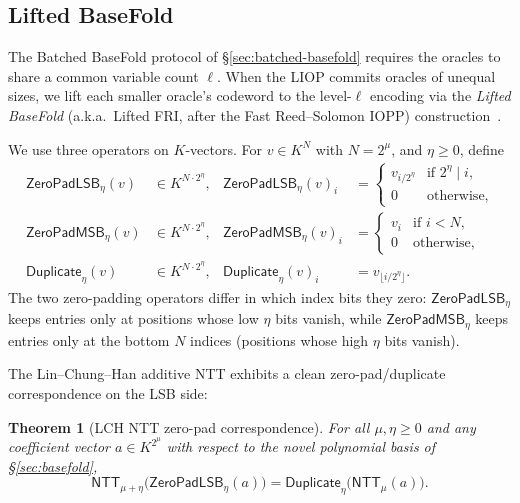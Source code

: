 \documentclass{article}
\newtheorem{theorem}{Theorem}[section]
\theoremstyle{definition}
\begin{document}
\subsection{Lifted BaseFold}
\label{sec:lifted-basefold}

The Batched BaseFold protocol of \S\ref{sec:batched-basefold} requires the oracles to share a common variable count $\boldsymbol{\ell}$. When the LIOP commits oracles of unequal sizes, we lift each smaller oracle's codeword to the level-$\boldsymbol{\ell}$ encoding via the \emph{Lifted BaseFold} (a.k.a.~Lifted FRI, after the Fast Reed--Solomon IOPP) construction~\cite{youtube:LiftedFRI}.

We use three operators on $K$-vectors. For $v \in K^N$ with $N = 2^\mu$, and $\eta \geq 0$, define
\begin{align*}
  \textsf{ZeroPadLSB}_\eta(v) &\in K^{N \cdot 2^\eta}, & \textsf{ZeroPadLSB}_\eta(v)_i &= \begin{cases} v_{i / 2^\eta} & \text{if } 2^\eta \mid i, \\ 0 & \text{otherwise,} \end{cases} \\
  \textsf{ZeroPadMSB}_\eta(v) &\in K^{N \cdot 2^\eta}, & \textsf{ZeroPadMSB}_\eta(v)_i &= \begin{cases} v_i & \text{if } i < N, \\ 0 & \text{otherwise,} \end{cases} \\
  \textsf{Duplicate}_\eta(v) &\in K^{N \cdot 2^\eta}, & \textsf{Duplicate}_\eta(v)_i &= v_{\lfloor i / 2^\eta \rfloor}.
\end{align*}
The two zero-padding operators differ in which index bits they zero: $\textsf{ZeroPadLSB}_\eta$ keeps entries only at positions whose low $\eta$ bits vanish, while $\textsf{ZeroPadMSB}_\eta$ keeps entries only at the bottom $N$ indices (positions whose high $\eta$ bits vanish).

The Lin--Chung--Han additive NTT exhibits a clean zero-pad/duplicate correspondence on the LSB side:

\begin{theorem}[LCH NTT zero-pad correspondence]
\label{thm:lch-ntt-zeropad}
For all $\mu, \eta \geq 0$ and any coefficient vector $a \in K^{2^\mu}$ with respect to the novel polynomial basis of \S\ref{sec:basefold},
\[
  \textsf{NTT}_{\mu + \eta}\bigl( \textsf{ZeroPadLSB}_\eta(a) \bigr) = \textsf{Duplicate}_\eta\bigl( \textsf{NTT}_\mu(a) \bigr).
\]
\end{theorem}
\end{document}
